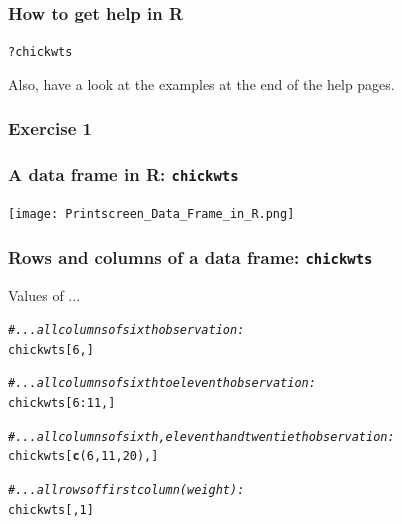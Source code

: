 \documentclass{beamer}\usepackage[]{graphicx}\usepackage[]{color}
\makeatletter
\newcommand{\hlnum}[1]{\textcolor[rgb]{0.686,0.059,0.569}{#1}}%
\newcommand{\hlcom}[1]{\textcolor[rgb]{0.678,0.584,0.686}{\textit{#1}}}%
\newcommand{\hlopt}[1]{\textcolor[rgb]{0,0,0}{#1}}%
\newcommand{\hlstd}[1]{\textcolor[rgb]{0.345,0.345,0.345}{#1}}%
\newcommand{\hlkwd}[1]{\textcolor[rgb]{0.737,0.353,0.396}{\textbf{#1}}}%
\newenvironment{kframe}{%
 \def\at@end@of@kframe{}%
 \ifinner\ifhmode%
  \def\at@end@of@kframe{\end{minipage}}%
  \begin{minipage}{\columnwidth}%
 \fi\fi%
 \def\FrameCommand##1{\hskip\@totalleftmargin \hskip-\fboxsep
 \colorbox{shadecolor}{##1}\hskip-\fboxsep
     \hskip-\linewidth \hskip-\@totalleftmargin \hskip\columnwidth}%
 \MakeFramed {\advance\hsize-\width
   \@totalleftmargin\z@ \linewidth\hsize
   \@setminipage}}%
 {\par\unskip\endMakeFramed%
 \at@end@of@kframe}
\newenvironment{knitrout}{}{} %
\makeatother
\begin{document}
{{%

\begin{frame}[fragile]
\frametitle{How to get help in R}
\begin{knitrout}\scriptsize
{}\color{fgcolor}\begin{kframe}
\begin{alltt}
\hlopt{?}\hlstd{chickwts}
\end{alltt}
\end{kframe}
\end{knitrout}
Also, have a look at the examples at the end of the help pages.
\end{frame}


\begin{frame}
\frametitle{Exercise 1}
\end{frame}



\begin{frame}
\frametitle{A data frame in R: \texttt{chickwts}}
\begin{center}
\texttt{[image: Printscreen\_Data\_Frame\_in\_R.png]}
\end{center}
\end{frame}


\begin{frame}[fragile]
\frametitle{Rows and columns of a data frame: \texttt{chickwts}}
Values of ...
\begin{knitrout}\scriptsize
{}\color{fgcolor}\begin{kframe}
\begin{alltt}
\hlcom{# ... all columns of sixth observation:}
\hlstd{chickwts[}\hlnum{6}\hlstd{, ]}

\hlcom{# ... all columns of sixth to eleventh observation:}
\hlstd{chickwts[}\hlnum{6}\hlopt{:}\hlnum{11}\hlstd{, ]}

\hlcom{# ... all columns of sixth, eleventh and twentieth observation:}
\hlstd{chickwts[}\hlkwd{c}\hlstd{(}\hlnum{6}\hlstd{,} \hlnum{11}\hlstd{,} \hlnum{20}\hlstd{), ]}

\hlcom{# ... all rows of first column (weight):}
\hlstd{chickwts[ ,} \hlnum{1}\hlstd{]}


\end{alltt}
\end{kframe}
\end{knitrout}
\end{frame}}}
\end{document}
